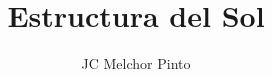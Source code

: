 \documentclass[12pt,addpoints,answers]{guia}
\title{Estructura del Sol}
\author{JC Melchor Pinto}
\begin{document}
\INFO%
\begin{questions}
    \questionboxed[25]{}
    \questionboxed[25]{}
\end{questions}
\end{document}
